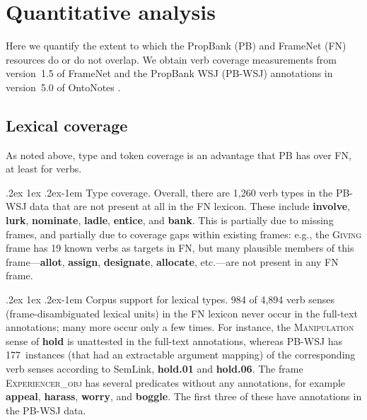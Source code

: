 \documentclass[11pt]{article}
\makeatletter
\newcommand{\ensuretext}[1]{#1}
\newcommand{\nssmarker}{\ensuretext{\textcolor{magenta}{\ensuremath{^{\textsc{NS}}_{\textsc{S}}}}}}
\newcommand{\arkcomment}[3]{\ensuretext{\textcolor{#3}{[#1 #2]}}}
\newcommand{\nss}[1]{\arkcomment{\nssmarker}{#1}{magenta}}
\renewcommand{\paragraph}{%
  \@startsection{paragraph}{4}%
  {\z@}{.2ex \@plus 1ex \@minus .2ex}{-1em}%
  {\normalfont\normalsize\bfseries}%
}
\newcommand{\finalversion}[1]{}
\newcommand{\vpred}[1]{\textbf{#1}} %
\newcommand{\fname}[1]{\textsc{#1}} %
\makeatother
\begin{document}
\section{Quantitative analysis}\label{sec:quant}

Here we quantify the extent to which the PropBank (PB) and FrameNet (FN) resources 
do or do not overlap. We obtain verb coverage measurements from version~1.5 of FrameNet 
and the PropBank WSJ (PB-WSJ) annotations in version~5.0 of OntoNotes \citep{ontonotes}. 

\subsection{Lexical coverage}\label{sec:coverage}


As noted above, type and token coverage is an advantage that PB has over FN, at least for verbs.

\paragraph{Type coverage.}
Overall, there are 1,260 verb types in the PB-WSJ data that are not present at all in the FN lexicon. 
These include \vpred{involve}, \vpred{lurk}, \vpred{nominate}, \vpred{ladle}, \vpred{entice}, and \vpred{bank}.
This is partially due to missing frames, and partially due to coverage gaps within existing frames:
e.g., the \fname{Giving} frame has 19 known verbs as targets in FN, but  
many plausible members of this frame---\vpred{allot}, \vpred{assign}, \vpred{designate}, \vpred{allocate}, etc.---are not present in any FN frame. 

\paragraph{Corpus support for lexical types.} 984 of 4,894 verb senses (frame-disambiguated lexical units) in the FN lexicon 
never occur in the full-text annotations; many more occur only a few times.\finalversion{\nss{how many verb *types* occur at least once in PB?}}
For instance, the \fname{Manipulation} sense of \vpred{hold} is unattested in the full-text annotations,
whereas PB-WSJ has 177~instances (that had an extractable argument mapping) of the corresponding 
verb senses according to SemLink, \vpred{hold.01} and \vpred{hold.06}.
The frame \fname{Experiencer\_obj} has several predicates without any annotations, 
for example \vpred{appeal}, \vpred{harass}, \vpred{worry}, and \vpred{boggle}. 
The first three of these have annotations in the PB-WSJ data. 
\end{document}
